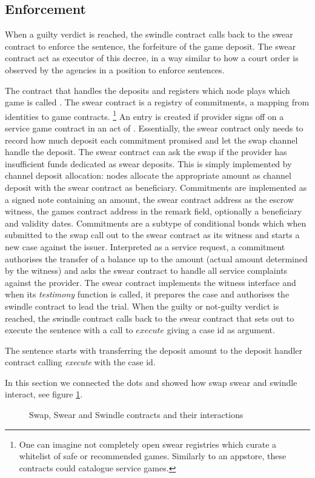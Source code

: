 \subsection{Enforcement}

When a guilty verdict is reached, the swindle contract calls back to the swear contract to enforce the sentence, the forfeiture of the game deposit. The swear contract act as executor of this decree, in a way similar to how a court order is observed by the agencies in a position to enforce sentences.  

The contract that handles the deposits and registers which node plays which game is called .
The swear contract is a registry of commitments, a mapping from identities to game contracts.%
%
\footnote{One can imagine not completely open swear registries which curate a whitelist of safe or recommended games. Similarly to an appstore, these contracts could catalogue service games.}
%
An entry is created if provider signs off on a service game contract in an act of . Essentially, the swear contract only needs to record how much deposit each commitment promised and let the swap channel handle the deposit.
The swear contract can  ask the swap if the provider has insufficient funds dedicated as  swear deposits. This is simply implemented by channel deposit allocation: nodes allocate the appropriate amount as channel deposit with the swear contract as beneficiary.
Commitments are implemented as a signed note containing an amount, the swear contract address as the escrow witness, the games contract address in the remark field, optionally a beneficiary and validity dates. Commitments are a subtype of conditional bonds which when submitted to the swap call out to the swear contract as its witness and starts a new case against the issuer. 
Interpreted as a service request, a commitment authorises the transfer of a balance up to the amount (actual amount determined by the witness) and asks the swear contract to handle all service complaints against the provider. The swear contract implements the witness interface and when its \emph{testimony} function is called, it prepares the case and authorises the swindle contract to lead the trial. When the guilty or not-guilty verdict is reached, the swindle contract calls back to the swear contract that sets out to execute the sentence with a call to $execute$ giving a case id as argument.

The sentence starts with transferring the deposit amount to the deposit handler contract calling \emph{execute} with the case id.


In this section we connected the dots and showed how swap swear and swindle interact, see figure \ref{fig:sw3}.

\begin{center}
\begin{figure}
\begin{center}
\begin{tikzpicture}
\end{tikzpicture}
\end{center}
\caption{Swap, Swear and Swindle contracts and their interactions}
\label{fig:sw3}
\end{figure}
\end{center}